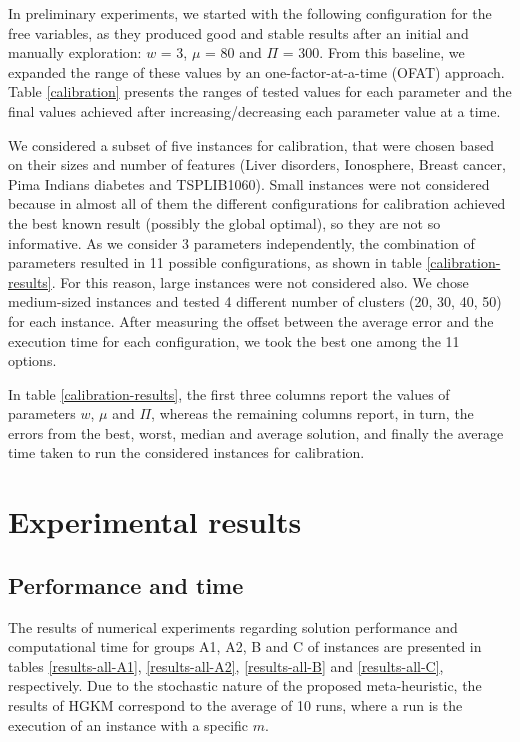In preliminary experiments, we started with the following configuration for the free variables, as they produced good and stable results after an initial and manually exploration: $w$ = 3, $\mu$ = 80 and $\Pi$ = 300. From this baseline, we expanded the range of these values by an one-factor-at-a-time (OFAT) approach. Table \ref{calibration} presents the ranges of tested values for each parameter and the final values achieved after increasing/decreasing each parameter value at a time.



We considered a subset of five instances for calibration, that were chosen based on their sizes and number of features (Liver disorders, Ionosphere, Breast cancer, Pima Indians diabetes and TSPLIB1060). Small instances were not considered because in almost all of them the different configurations for calibration achieved the best known result (possibly the global optimal), so they are not so informative. As we consider 3 parameters independently, the combination of parameters resulted in 11 possible configurations, as shown in table \ref{calibration-results}. For this reason, large instances were not considered also.
We chose medium-sized instances and tested 4 different number of clusters (20, 30, 40, 50) for each instance. After measuring the offset between the average error and the execution time for each configuration, we took the best one among the 11 options.

In table \ref{calibration-results}, the first three columns report the values of parameters $w$, $\mu$ and $\Pi$, whereas the remaining columns report, in turn, the errors from the best, worst, median and average solution, and finally the average time taken to run the considered instances for calibration.



\section{Experimental results}
\label{sec:results}

\subsection{Performance and time}
\label{sec:performance}
The results of numerical experiments regarding solution performance and computational time for groups A1, A2, B and C of instances are presented in tables \ref{results-all-A1}, \ref{results-all-A2}, \ref{results-all-B} and \ref{results-all-C}, respectively. Due to the stochastic nature of the proposed meta-heuristic, the results of HGKM correspond to the average of 10 runs, where a run is the execution of an instance with a specific $m$. 


